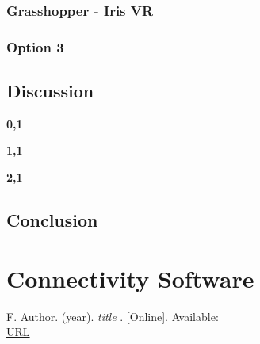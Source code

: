 \documentclass[letterpaper,10pt,onecolumn,compsoc]{IEEEtran}
\begin{document}
\noindent


\subsubsection{Grasshopper - Iris VR}

\noindent


\subsubsection{Option 3}

\noindent


\subsection{Discussion}

\noindent\leavevmode{}\hfill{\textbf{0,1}}\hfill{}\par

\noindent\leavevmode{}\hfill{\textbf{1,1}}\hfill{}\par

\noindent\leavevmode{}\hfill{\textbf{2,1}}\hfill{}\par

\subsection{Conclusion}



\newpage

\iffalse
\fi

\section{Connectivity Software}

\noindent



\iffalse
\fi

\newpage


\begin{thebibliography}{1}

F. Author. (year). 
\textit{title} 
. [Online]. Available: 
\\\url{URL}
\\


\iffalse
\bibitem{first}
F. Author. (year). 
\textit{title} 
. [Online]. Available: 
\\\url{URL}
\fi

\end{thebibliography}
\end{document}
